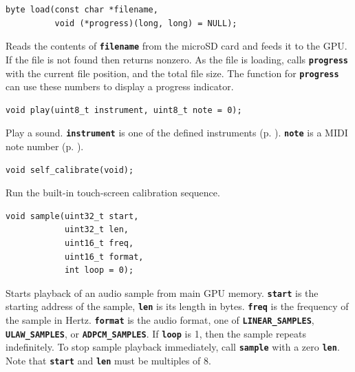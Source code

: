 \documentclass[10pt]{book}
\newcommand{\mach}[1]{\texttt{\textbf{#1}}}
\begin{document}
\begin{CJK}{UTF8}{gkai}

\begin{framed}
\begin{verbatim}
byte load(const char *filename,
          void (*progress)(long, long) = NULL);
\end{verbatim}
\end{framed}

Reads the contents of \mach{filename} from the microSD card and
feeds it to the GPU.
If the file is not found then returns nonzero.
As the file is loading, calls \mach{progress} with the current file position,
and the total file size.
The function for \mach{progress} can use these numbers to display a progress indicator.


\begin{framed}
\begin{verbatim}
void play(uint8_t instrument, uint8_t note = 0);
\end{verbatim}
\end{framed}

Play a sound. \mach{instrument} is one of the defined instruments (p. \pageref{instruments}).
\mach{note} is a MIDI note number (p. \pageref{MIDI}).


\begin{framed}
\begin{verbatim}
void self_calibrate(void);
\end{verbatim}
\end{framed}

Run the built-in touch-screen calibration sequence.


\begin{framed}
\begin{verbatim}
void sample(uint32_t start,
            uint32_t len,
            uint16_t freq,
            uint16_t format,
            int loop = 0);
\end{verbatim}
\end{framed}

Starts playback of an audio sample from main GPU memory.
\mach{start} is the starting address of the sample,
\mach{len} is its length in bytes.
\mach{freq} is the frequency of the sample in Hertz.
\mach{format} is the audio format, one of
\mach{LINEAR\_SAMPLES},
\mach{ULAW\_SAMPLES}, or
\mach{ADPCM\_SAMPLES}.
If \mach{loop} is 1, then the sample repeats indefinitely.
To stop sample playback immediately, call \mach{sample} with a zero \mach{len}.
Note that \mach{start} and \mach{len} must be multiples of 8.


\end{CJK}
\end{document}
